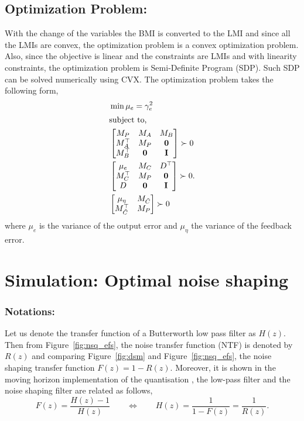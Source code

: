 \documentclass[a4paper]{article}
\begin{document}
\subsection{Optimization Problem:}
With the change of the variables the BMI is converted to the LMI and since all the LMIs are convex, the optimization problem is a convex optimization problem. Also, since the objective is linear and the constraints are LMIs and with linearity constraints, the optimization problem is Semi-Definite Program (SDP). Such SDP can be solved numerically using CVX. The optimization problem takes the following form, 
\begin{align}
	&\min \mu_{e} = \gamma_{e}^{2} \label{eq:sdpconsobj} \\
	\intertext{subject to,} 	
	&\begin{bmatrix}
		M_{P} & M_{A} & M_{B}\\
		M_{A}^{\top} & M_{P} & \mathbf{0} \\
		M_{B}^{\top} & \mathbf{0} & \mathbf{I}
	\end{bmatrix} \succ 0 \label{eq:sdpcons1} \\
	&\begin{bmatrix}	
	\mu_{e} & M_{C} & D^{\top} \\
	M_{C}^{\top} & M_{P} & \mathbf{0} \\
	D & \mathbf{0} & \mathbf{I}
	\end{bmatrix} \succ 0 . \label{eq:sdpcons2} \\
	&\begin{bmatrix}
		\mu_{\eta} & M_{\tilde{C}} \\
		M_{\tilde{C}}^{\top} & M_{P}
	\end{bmatrix} \succ 0 \label{eq:sdpcons3}
\end{align}
where $\mu_{e}$ is the variance of the output error  and $\mu_{\eta} $ the variance of the feedback error. 


\section{Simulation: Optimal noise shaping}

\subsubsection*{Notations:}
Let us denote the transfer function of a Butterworth low pass filter as $H(z)$.  Then from Figure~\ref{fig:nsq_efs},  the noise transfer function (NTF) is denoted by $R(z)$ and comparing Figure~\ref{fig:dsm} and Figure~\ref{fig:nsq_efs}, the noise shaping transfer function $F(z) = 1- R(z).$ Moreover,  it is shown in the moving horizon implementation of the quantisation \cite{goodwin2003moving}, the low-pass filter and the noise shaping filter are related as follows, 
\begin{equation}
   F(z)= \frac{H(z)-1}{H(z)} \qquad \Leftrightarrow   \qquad H(z) = \frac{1}{1- F(z)} = \frac{1}{R(z)}.
   \label{eq:filter_relationship}
\end{equation}
\end{document}
